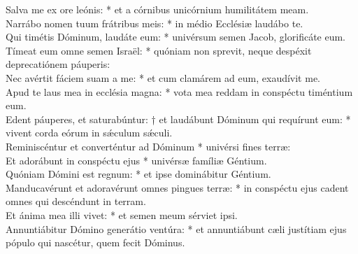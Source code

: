 {	Salva me ex ore leónis: * et a córnibus unicórnium humilitátem meam. \\
	Narrábo nomen tuum frátribus meis: * in médio Ecclésiæ laudábo te. \\
	Qui timétis Dóminum, laudáte eum: * univérsum semen Jacob, glorificáte eum. \\
	Tímeat eum omne semen Israël: * quóniam non sprevit, neque despéxit deprecatiónem páuperis: \\
	Nec avértit fáciem suam a me: * et cum clamárem ad eum, exaudívit me. \\
	Apud te laus mea in ecclésia magna: * vota mea reddam in conspéctu timéntium eum. \\
	Edent páuperes, et saturabúntur: † et laudábunt Dóminum qui requírunt eum: * vivent corda eórum in sǽculum sǽculi. \\
	Reminiscéntur et converténtur ad Dóminum * univérsi fines terræ: \\
	Et adorábunt in conspéctu ejus * univérsæ famíliæ Géntium. \\
	Quóniam Dómini est regnum: * et ipse dominábitur Géntium. \\
	Manducavérunt et adoravérunt omnes pingues terræ: * in conspéctu ejus cadent omnes qui descéndunt in terram. \\
	Et ánima mea illi vivet: * et semen meum sérviet ipsi. \\
	Annuntiábitur Dómino generátio ventúra: * et annuntiábunt cæli justítiam ejus pópulo qui nascétur, quem fecit Dóminus. \\
}


